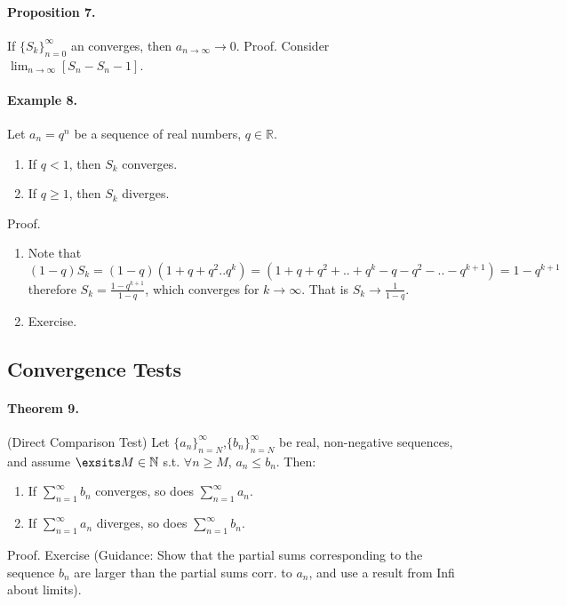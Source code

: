 \paragraph{Proposition 7.} If \( \{ S_k \}^{\infty}_{n=0} \) an converges, then \( a_{n\rightarrow\infty} \rightarrow 0 \). Proof. Consider \( \lim_{n\rightarrow\infty} [S_{n} - S{_n-1}]\).

\paragraph{Example 8.} Let \(a_{n}= q^n\) be a sequence of real numbers, \(q \in \mathbb{R}\).
\begin{enumerate}
    \item If \(q < 1\), then \(S_k\) converges.
    \item If \( q \ge 1\), then \(S_k\) diverges.
\end{enumerate}
Proof.
\begin{enumerate}
    \item Note that \[(1-q)S_{k} = \left(1-q\right)\left(1 + q + q^2 .. q^k \right) = \left(1 + q + q^2 + .. + q^k - q - q^2 - .. - q^{k+1} \right) = 1 - q^{k+1}   \] therefore \(S_k = \frac{1-q^{k+1}}{1-q} \), which    converges for \(k \rightarrow \infty \). That is \( S_k \rightarrow \frac{1}{1-q} \).
    \item Exercise.
\end{enumerate}
\subsection{Convergence Tests}
\paragraph{Theorem 9.} (Direct Comparison Test) Let \( \{a_n\}^{\infty}_{n = N} \),\( \{b_n\}^{\infty}_{n = N} \) be real, non-negative sequences, and assume \( \exsits M \in \mathbb{N}\) s.t. \( \forall n \ge M\), \( a_n \le b_n\). Then:
\begin{enumerate}
    \item If \(\sum^{\infty}_{n=1}{b_n}\) converges, so does \(\sum^{\infty}_{n=1}{a_n}\).
    \item If \(\sum^{\infty}_{n=1}{a_n}\) diverges, so does \(\sum^{\infty}_{n=1}{b_n}\).
\end{enumerate}


Proof. Exercise (Guidance: Show that the partial sums corresponding to the sequence \(b_n\) are larger than the partial sums
corr. to \(a_n\), and use a result from Infi about limits).

